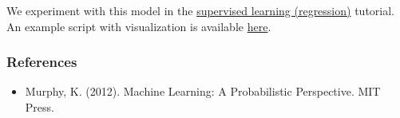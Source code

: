 We experiment with this model in the \href{tut_supervised_regression}{supervised
learning (regression)} tutorial.
An example script with visualization is available
\href{https://github.com/blei-lab/edward/blob/master/examples/bayesian_linear_regression_plot.py}
{here}.

\subsubsection{References}\label{references}

\begin{itemize}
\item
  Murphy, K. (2012). Machine Learning: A Probabilistic Perspective. MIT Press.
\end{itemize}
